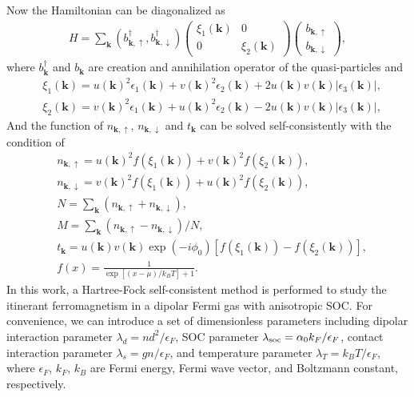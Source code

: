 \documentclass[twocolumn,english,pra,superscriptaddress]{revtex4-1}
\begin{document}
Now the Hamiltonian can be diagonalized as
\begin{align}
H=\sum_{\mathbf{k}}(b_{\mathbf{k},\uparrow}^{\dagger},b_{\mathbf{k},\downarrow}^{\dagger})\begin{pmatrix}
\xi_{1}(\mathbf{k})&0\\
0&\xi_{2}(\mathbf{k})
\end{pmatrix}
\begin{pmatrix}
b_{\mathbf{k},\uparrow}\\b_{\mathbf{k},\downarrow}
\end{pmatrix},
\end{align}
where $b_{\mathbf{k}}^{\dagger}$ and $b_{\mathbf{k}}$ are creation and annihilation operator of the quasi-particles and
\begin{subequations}
\begin{align}
&\xi_{1}(\mathbf{k})=u(\mathbf{k})^2\epsilon_{1}(\mathbf{k})+v(\mathbf{k})^2\epsilon_{2}(\mathbf{k})+2u(\mathbf{k})v(\mathbf{k})|\epsilon_{3}(\mathbf{k})|,\\
&\xi_{2}(\mathbf{k})=v(\mathbf{k})^2\epsilon_{1}(\mathbf{k})+u(\mathbf{k})^2\epsilon_{2}(\mathbf{k})-2u(\mathbf{k})v(\mathbf{k})|\epsilon_{3}(\mathbf{k})|,
\end{align}
\end{subequations}
And the function of $n_{\mathbf{k},\uparrow}$, $n_{\mathbf{k},\downarrow}$ and $t_{\mathbf{k}}$ can be solved self-consistently with the condition of
\begin{subequations}
\begin{align}
&n_{\mathbf{k},\uparrow}=u(\mathbf{k})^2f\left(\xi_{1}(\mathbf{k})\right)+v(\mathbf{k})^2f(\xi_{2}(\mathbf{k})),\\
&n_{\mathbf{k},\downarrow}=v(\mathbf{k})^2f(\xi_{1}(\mathbf{k}))+u(\mathbf{k})^2f(\xi_{2}(\mathbf{k})),\\
&N=\sum_{\mathbf{k}}(n_{\mathbf{k},\uparrow}+n_{\mathbf{k},\downarrow}),\\
&M=\sum_{\mathbf{k}}(n_{\mathbf{k},\uparrow}-n_{\mathbf{k},\downarrow})/N,\\
&t_{\mathbf{k}}=u(\mathbf{k})v(\mathbf{k})\exp(-i\phi_{0})\left[f(\xi_{1}(\mathbf{k}))-f(\xi_{2}(\mathbf{k}))\right],\\
&f(x)=\frac{1}{\exp[(x-\mu)/k_{B}T]+1}.
\end{align}
\end{subequations}
In this work, a Hartree-Fock self-consistent method is performed to study the itinerant ferromagnetism in a dipolar Fermi gas with anisotropic SOC. For convenience, we can introduce a set of dimensionless parameters including dipolar interaction
 parameter $\lambda_{d}=n d^{2}/\epsilon_{F}$, SOC parameter $\lambda_{\rm soc}=\alpha_{0}k_{F}/\epsilon_{F}$, contact interaction parameter $\lambda_{s}=gn/\epsilon_{F}$, and temperature parameter $\lambda_{T}=k_{B}T/\epsilon_{F}$, where $\epsilon_{F}$, $k_{F}$, $k_{B}$ are Fermi energy, Fermi wave vector, and Boltzmann constant, respectively.
\end{document}
